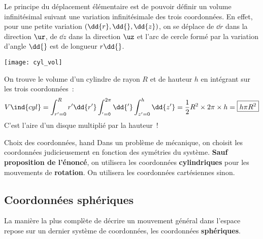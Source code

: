 \documentclass[../main/main.tex]{subfiles}
\begin{document}
\begin{minipage}{0.70\linewidth}
	Le principe du déplacement élémentaire est de pouvoir définir un volume
	infinitésimal suivant une variation infinitésimale des trois coordonnées. En
	effet, pour une petite variation $(\dd{r}, \dd{\tt}, \dd{z})$, on se déplace
	de $\dd{r}$ dans la direction $\ur$, de $\dd{z}$ dans la direction $\uz$ et
	l'arc de cercle formé par la variation d'angle $\dd{\tt}$ est de longueur
	$r\dd{\tt}$. \bigbreak
\end{minipage}
\hfill
\begin{minipage}{0.25\linewidth}
	\begin{center}
		\texttt{[image: cyl\_vol]}
	\end{center}
\end{minipage}

On trouve le volume d'un cylindre de rayon $R$ et de hauteur $h$ en
intégrant sur les trois coordonnées~:
\[V\ind{cyl} = \int_{r'=0}^{R} r'\dd{r'} \int_{\tt'=0}^{2\pi} \dd{\tt'}
	\int_{z'=0}^{h} \dd{z'} = \frac{1}{2}R^2\times 2\pi \times h =
	\boxed{h\pi R^2}\]
C'est l'aire d'un disque multiplié par la hauteur~!

\begin{timpo}{Choix des coordonnées, hand}
	Dans un problème de mécanique, on choisit les coordonnées judicieusement en
	fonction des symétries du système. \textbf{Sauf proposition de l'énoncé}, on
	utilisera les coordonnées \textbf{cylindriques} pour les mouvements de
	\textbf{rotation}. On utilisera les coordonnées cartésiennes sinon.
\end{timpo}

\subsection{Coordonnées sphériques}
La manière la plus complète de décrire un mouvement général dans l'espace repose
sur un dernier système de coordonnées, les coordonnées \textbf{sphériques}.
\end{document}
